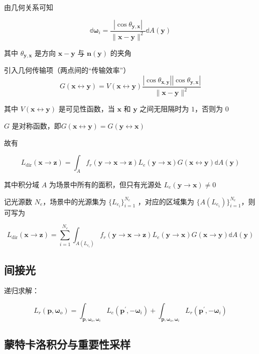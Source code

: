 \documentclass[14pt]{scrartcl} %
\begin{document}
\pagebreak

由几何关系可知

\begin{equation}
\mathbb{d}\pmb{\omega}_i=\frac{|\cos\theta_{\pmb{y},\pmb{x}}|}{\|\pmb{x}-\pmb{y}\|^2}\mathbb{d}A(\pmb{y})
\end{equation}

其中 $\theta_{\pmb{y},\pmb{x}}$ 是方向 $\pmb{x}-\pmb{y}$ 与 $\pmb{n}(\pmb{y})$ 的夹角

引入几何传输项（两点间的“传输效率”）
\begin{equation}
G(\pmb{x}\leftrightarrow\pmb{y})=V(\pmb{x}\leftrightarrow\pmb{y})\frac{|\cos\theta_{\pmb{x},\pmb{y}}||\cos\theta_{\pmb{y},\pmb{x}}|}{\|\pmb{x}-\pmb{y}\|^2}
\end{equation}

其中 $V(\pmb{x}\leftrightarrow\pmb{y})$ 是可见性函数，当 $\pmb{x}$ 和 $\pmb{y}$ 之间无阻隔时为 $1$，否则为 $0$ 

$G$ 是对称函数，即$G(\pmb{x}\leftrightarrow\pmb{y})=G(\pmb{y}\leftrightarrow\pmb{x})$ 

故有

$$
L_{\text{dir}}(\pmb{x}\to\pmb{z})=\int_A f_r(\pmb{y}\to \pmb{x}\to\pmb{z})L_e(\pmb{y}\to\pmb{x})G(\pmb{x}\leftrightarrow\pmb{y})\mathbb{d}A(\pmb{y})
$$

其中积分域 $A$ 为场景中所有的面积，但只有光源处 $L_e(\pmb{y}\to\pmb{x})\neq 0$ 

记光源数 $N_e$，场景中的光源集为 $\{L_{e_i}\}_{i=1}^{N_e}$ ，对应的区域集为 $\{A(L_{e_i})\}_{i=1}^{N_e}$，则可写为

$$
L_{\text{dir}}(\pmb{x}\to\pmb{z})=\sum_{i=1}^{N_e}\int_{A(L_{e_i})} f_r(\pmb{y}\to\pmb{x}\to\pmb{z})L_e(\pmb{y}\to\pmb{x})G(\pmb{x}\to\pmb{y})\mathbb{d}A(\pmb{y})
$$

\subsection{间接光}

递归求解：

\begin{equation}
L_r(\pmb{p},\pmb{\omega}_o)=\int_{\pmb{p},\pmb{\omega}_o,\pmb{\omega}_i}L_e(\pmb{p}^\prime,-\pmb{\omega}_i)
+\int_{\pmb{p},\pmb{\omega}_o,\pmb{\omega}_i}L_r(\pmb{p}^\prime,-\pmb{\omega}_i)
\end{equation}

\subsection{蒙特卡洛积分与重要性采样}
\end{document}
